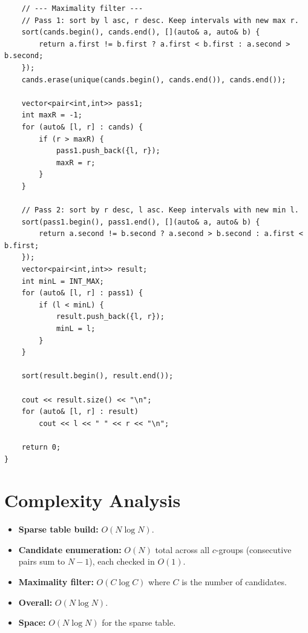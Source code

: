 \documentclass[11pt,a4paper]{article}
\begin{document}
\begin{lstlisting}
    // --- Maximality filter ---
    // Pass 1: sort by l asc, r desc. Keep intervals with new max r.
    sort(cands.begin(), cands.end(), [](auto& a, auto& b) {
        return a.first != b.first ? a.first < b.first : a.second > b.second;
    });
    cands.erase(unique(cands.begin(), cands.end()), cands.end());

    vector<pair<int,int>> pass1;
    int maxR = -1;
    for (auto& [l, r] : cands) {
        if (r > maxR) {
            pass1.push_back({l, r});
            maxR = r;
        }
    }

    // Pass 2: sort by r desc, l asc. Keep intervals with new min l.
    sort(pass1.begin(), pass1.end(), [](auto& a, auto& b) {
        return a.second != b.second ? a.second > b.second : a.first < b.first;
    });
    vector<pair<int,int>> result;
    int minL = INT_MAX;
    for (auto& [l, r] : pass1) {
        if (l < minL) {
            result.push_back({l, r});
            minL = l;
        }
    }

    sort(result.begin(), result.end());

    cout << result.size() << "\n";
    for (auto& [l, r] : result)
        cout << l << " " << r << "\n";

    return 0;
}
\end{lstlisting}

\section{Complexity Analysis}
\begin{itemize}
  \item \textbf{Sparse table build:} $O(N \log N)$.
  \item \textbf{Candidate enumeration:} $O(N)$ total across all
        $c$-groups (consecutive pairs sum to $N - 1$), each checked in
        $O(1)$.
  \item \textbf{Maximality filter:} $O(C \log C)$ where $C$ is the
        number of candidates.
  \item \textbf{Overall:} $O(N \log N)$.
  \item \textbf{Space:} $O(N \log N)$ for the sparse table.
\end{itemize}
\end{document}
